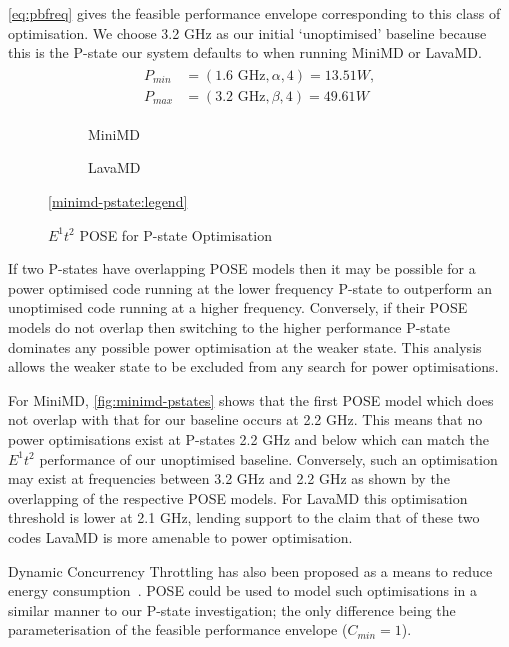 \autoref{eq:pbfreq} gives the feasible performance envelope corresponding to this class of optimisation.
We choose 3.2 GHz as our initial `unoptimised' baseline because this is the P-state our system defaults to when running MiniMD or LavaMD.
\begin{align}
  \label{eq:pbfreq}
  \begin{split}
    P_{min} &= (1.6\text{ GHz}, \alpha, 4) = 13.51W, \\
    P_{max} &= (3.2\text{ GHz}, \beta, 4) = 49.61W
  \end{split}
\end{align}

\begin{figure*}[t]%
  \scriptsize
\begin{subfigure}[t]{.5\linewidth}%
%
\caption{MiniMD}%
\label{fig:minimd-pstates}%
\end{subfigure}%
\begin{subfigure}[t]{.5\linewidth}%
%
\caption{LavaMD}%
\label{fig:lavamd-pstates}%
\end{subfigure}%
\begin{center}%
\ref{minimd-pstate:legend}%
\end{center}%
\caption{$E^1t^2$ POSE for P-state Optimisation}%
\label{fig:pstates}%
\end{figure*}%

If two P-states have overlapping POSE models then it may be possible for a power optimised code running at the lower frequency P-state to outperform an unoptimised code running at a higher frequency.
Conversely, if their POSE models do not overlap then switching to the higher performance P-state dominates any possible power optimisation at the weaker state.
This analysis allows the weaker state to be excluded from any search for power optimisations.

For MiniMD, \autoref{fig:minimd-pstates} shows that the first POSE model which does not overlap with that for our baseline occurs at 2.2 GHz.
This means that no power optimisations exist at P-states 2.2 GHz and below which can match the $E^1t^2$ performance of our unoptimised baseline.
Conversely, such an optimisation may exist at frequencies between 3.2 GHz and 2.2 GHz as shown by the overlapping of the respective POSE models.
For LavaMD this optimisation threshold is lower at 2.1 GHz, lending support to the claim that of these two codes LavaMD is more amenable to power optimisation.

Dynamic Concurrency Throttling has also been proposed as a means to reduce energy consumption~\cite{maury:2006aa}.
POSE could be used to model such optimisations in a similar manner to our P-state investigation; the only difference being the parameterisation of the feasible performance envelope ($C_{min}=1$).

